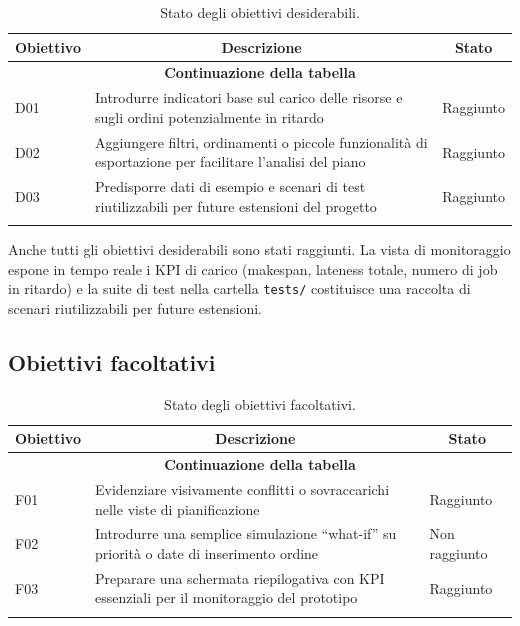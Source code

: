 \begin{center}
\begin{longtable}{|p{1.2cm}|p{8.8cm}|p{2.0cm}|}
\hline
\multicolumn{1}{|c|}{\textbf{Obiettivo}} &
\multicolumn{1}{c|}{\textbf{Descrizione}} &
\multicolumn{1}{c|}{\textbf{Stato}} \\
\hline
\endfirsthead
\hline
\multicolumn{3}{c}{{\bfseries Continuazione della tabella}}\\
\hline
\endhead

D01 & Introdurre indicatori base sul carico delle risorse e sugli ordini potenzialmente in ritardo & Raggiunto \\
\hline
D02 & Aggiungere filtri, ordinamenti o piccole funzionalità di esportazione per facilitare l'analisi del piano & Raggiunto \\
\hline
D03 & Predisporre dati di esempio e scenari di test riutilizzabili per future estensioni del progetto & Raggiunto \\
\hline

\caption{Stato degli obiettivi desiderabili.}
\label{tab:obiettivi_desiderabili}
\end{longtable}
\end{center}

Anche tutti gli obiettivi desiderabili sono stati raggiunti. La vista di monitoraggio espone in tempo reale i KPI di carico (makespan, lateness totale, numero di job in ritardo) e la suite di test nella cartella \texttt{tests/} costituisce una raccolta di scenari riutilizzabili per future estensioni.

\subsection{Obiettivi facoltativi}

\begin{center}
\begin{longtable}{|p{1.2cm}|p{8.8cm}|p{2.0cm}|}
\hline
\multicolumn{1}{|c|}{\textbf{Obiettivo}} &
\multicolumn{1}{c|}{\textbf{Descrizione}} &
\multicolumn{1}{c|}{\textbf{Stato}} \\
\hline
\endfirsthead
\hline
\multicolumn{3}{c}{{\bfseries Continuazione della tabella}}\\
\hline
\endhead

F01 & Evidenziare visivamente conflitti o sovraccarichi nelle viste di pianificazione & Raggiunto \\
\hline
F02 & Introdurre una semplice simulazione ``what-if'' su priorità o date di inserimento ordine & Non raggiunto \\
\hline
F03 & Preparare una schermata riepilogativa con KPI essenziali per il monitoraggio del prototipo & Raggiunto \\
\hline

\caption{Stato degli obiettivi facoltativi.}
\label{tab:obiettivi_facoltativi}
\end{longtable}
\end{center}

